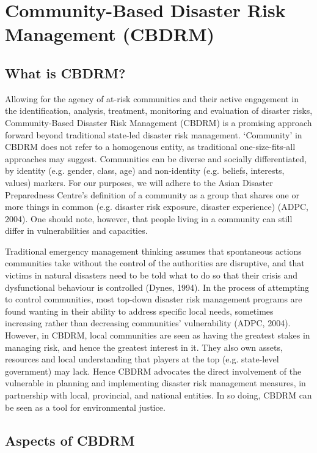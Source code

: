 \section{Community-Based Disaster Risk Management (CBDRM)}

\subsection{What is CBDRM?}

Allowing for the agency of at-risk communities and their active engagement in the identification, analysis, treatment, monitoring and evaluation of disaster risks, Community-Based Disaster Risk Management (CBDRM) is a promising approach forward beyond traditional state-led disaster risk management. ‘Community' in CBDRM does not refer to a homogenous entity, as traditional one-size-fits-all approaches may suggest. Communities can be diverse and socially differentiated, by identity (e.g. gender, class, age) and non-identity (e.g. beliefs, interests, values) markers. For our purposes, we will adhere to the Asian Disaster Preparedness Centre's definition of a community as a group that shares one or more things in common (e.g. disaster risk exposure, disaster experience) (ADPC, 2004). One should note, however, that people living in a community can still differ in vulnerabilities and capacities.

Traditional emergency management thinking assumes that spontaneous actions communities take without the control of the authorities are disruptive, and that victims in natural disasters need to be told what to do so that their crisis and dysfunctional behaviour is controlled (Dynes, 1994). In the process of attempting to control communities, most top-down disaster risk management programs are found wanting in their ability to address specific local needs, sometimes increasing rather than decreasing communities' vulnerability (ADPC, 2004). However, in CBDRM, local communities are seen as having the greatest stakes in managing risk, and hence the greatest interest in it. They also own assets, resources and local understanding that players at the top (e.g. state-level government) may lack. Hence CBDRM advocates the direct involvement of the vulnerable in planning and implementing disaster risk management measures, in partnership with local, provincial, and national entities. In so doing, CBDRM can be seen as a tool for environmental justice.

\subsection{Aspects of CBDRM}	

